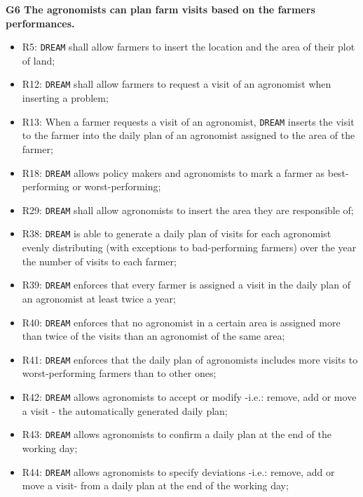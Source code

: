 \documentclass{article}
\begin{document}
\vspace{5mm}
\textbf{G6 The agronomists can plan farm visits based on the farmers performances.}
\begin{itemize}
    \item R5: \verb|DREAM| shall allow farmers to insert the location and the area of their plot of land;
    
    \item R12: \verb|DREAM| shall allow farmers to request a visit of an agronomist when inserting a problem;

  \item R13: When a farmer requests a visit of an agronomist, \verb|DREAM| inserts the visit to the farmer into the daily plan of an agronomist assigned to the area of the farmer;
    
    \item R18: \verb|DREAM| allows policy makers and agronomists to mark a farmer as best-performing or worst-performing;
    
    \item R29: \verb|DREAM| shall allow agronomists to insert the area they are responsible of;
    
    \item R38: \verb|DREAM| is able to generate a daily plan of visits for each agronomist evenly distributing (with exceptions to bad-performing farmers) over the year the number of visits to each farmer;

    \item R39: \verb|DREAM| enforces that every farmer is assigned a visit in the daily plan of an agronomist at least twice a year;

    \item R40: \verb|DREAM| enforces that no agronomist in a certain area is assigned more than twice of the visits than an agronomist of the same area;

    \item R41: \verb|DREAM| enforces that the daily plan of agronomists includes more visits to worst-performing farmers than to other ones;

    \item R42: \verb|DREAM| allows agronomists to accept or modify -i.e.: remove, add or move a visit - the automatically generated daily plan;

    \item R43: \verb|DREAM| allows agronomists to confirm a daily plan at the end of the working day; 

    \item R44: \verb|DREAM| allows agronomists to specify deviations -i.e.: remove, add or move a visit- from a daily plan at the end of the working day; 


\end{itemize}
\end{document}

